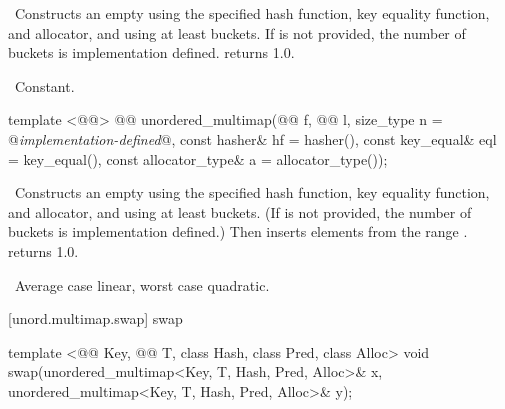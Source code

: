 \documentclass[american,twoside]{book}
\begin{document}
\begin{itemdescr}
\pnum
\effects\ Constructs an empty  using the
specified hash function, key equality function, and allocator, and
using at least \textit{} buckets.  If \textit{} is not
provided, the number of buckets is implementation defined.
 returns 1.0.

\pnum
\complexity\ Constant.
\end{itemdescr}

%
\begin{itemdecl}
template <@@>
  @@
  unordered_multimap(@@ f, @@ l,
                     size_type n = @\textit{implementation-defined}@,
                     const hasher& hf = hasher(),
                     const key_equal& eql = key_equal(),
                     const allocator_type& a = allocator_type());
\end{itemdecl}

\begin{itemdescr}
\pnum
\effects\ Constructs an empty  using the
specified hash function, key equality function, and allocator, and
using at least \textit{} buckets.  (If \textit{} is not
provided, the number of buckets is implementation defined.)  Then
inserts elements from the range \tcode{[\textit{f}, \textit{l})}.
 returns 1.0.

\pnum
\complexity\ Average case linear, worst case quadratic.
\end{itemdescr}

[unord.multimap.swap]{ swap}

%
%
\begin{itemdecl}
template <@@ Key, @@ T, class Hash, class Pred, class Alloc>
  void swap(unordered_multimap<Key, T, Hash, Pred, Alloc>& x,
            unordered_multimap<Key, T, Hash, Pred, Alloc>& y);
\end{itemdecl}
\end{document}
